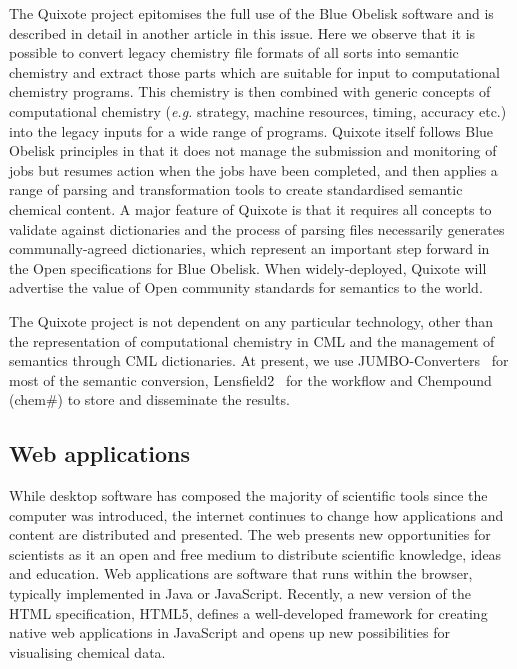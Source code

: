 \documentclass[10pt]{bmc_article}
\newenvironment{bmcformat}{\fussy\setboolean{publ}{true}}{\fussy}
\begin{document}
\begin{bmcformat}
The Quixote project epitomises the full use of the Blue Obelisk
software and is described in detail in another article
in this issue. Here we observe that it is possible
to convert legacy chemistry file formats
of all sorts into semantic chemistry and extract
those parts which are suitable for input to computational chemistry
programs. This chemistry is then combined with
generic concepts of computational chemistry ({\it e.g.} strategy,
machine resources, timing, accuracy etc.) into the
legacy inputs for a wide range of programs. Quixote itself follows
Blue Obelisk principles in that it does not manage
the submission and monitoring of jobs but resumes action when the jobs
have been completed, and then applies a range
of parsing and transformation tools to create standardised semantic
chemical content. A major feature of Quixote is
that it requires all concepts to validate against dictionaries and the
process of parsing files necessarily generates
communally-agreed dictionaries, which represent an important step
forward in the Open specifications for Blue Obelisk.
When widely-deployed, Quixote will advertise the value of Open
community standards for semantics to the world.

The Quixote project is not dependent on any particular technology,
other than the representation of computational
chemistry in CML and the management of semantics through CML
dictionaries. At present, we use JUMBO-Converters~\cite{JUMBO-Converters} for most
 of the semantic conversion, Lensfield2~\cite{Lensfield2} for the workflow and Chempound
(chem\#) \cite{Chempound} to store and disseminate the results.

\subsection*{Web applications}

While desktop software has composed the majority of scientific tools
since the computer was introduced, the internet continues to change
how applications and content are distributed and presented. The web
presents new opportunities for scientists as it
an open and free medium to distribute scientific knowledge, ideas and
education. Web applications are software that runs within the browser,
typically implemented in Java or JavaScript.
Recently, a new version of the HTML
specification, HTML5, defines a well-developed framework
for creating native web applications in JavaScript and opens up
new possibilities for visualising chemical data.


\end{bmcformat}
\end{document}
